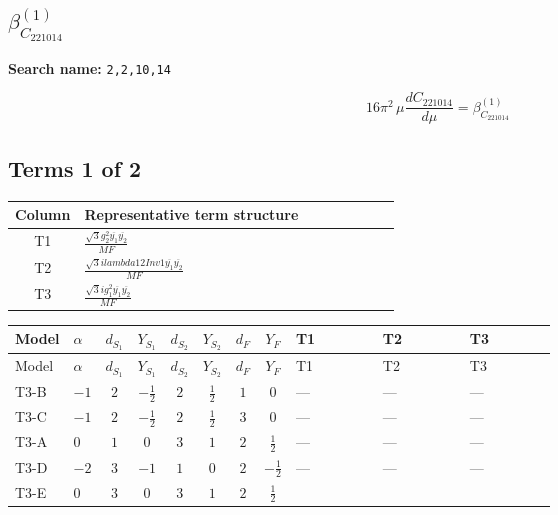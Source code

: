 \documentclass[8pt]{article}
\begin{document}
\begin{landscape}
\section*{$\beta_{C_{221014}}^{(1)}$}
\noindent\textbf{Search name: }\texttt{2,2,10,14}\par\smallskip
\[16\pi^2\,\mu\frac{d C_{221014}}{d\mu}=\beta_{C_{221014}}^{(1)}\]
\subsection*{Terms 1 of 2}
\begin{center}
\begin{tabular}{@{}c >{\raggedright\arraybackslash}p{0.82\linewidth}@{}}
\toprule
Column & Representative term structure \\
\midrule
T1 & \(\displaystyle \frac{\sqrt{3} g_{2}^{2} \overline{y_{1}} \overline{y_{2}}}{MF}\) \\
\midrule
T2 & \(\displaystyle \frac{\sqrt{3} i lambda12Inv1 \overline{y_{1}} \overline{y_{2}}}{MF}\) \\
\midrule
T3 & \(\displaystyle \frac{\sqrt{3} i g_{1}^{2} \overline{y_{1}} \overline{y_{2}}}{MF}\) \\
\midrule
\bottomrule
\end{tabular}
\end{center}
\smallskip
\tiny
\begin{longtable}{@{}llcccccc >{\raggedright\arraybackslash}p{0.21\linewidth} >{\raggedright\arraybackslash}p{0.21\linewidth} >{\raggedright\arraybackslash}p{0.21\linewidth}@{}}
\toprule
Model & $\alpha$ & $d_{S_1}$ & $Y_{S_1}$ & $d_{S_2}$ & $Y_{S_2}$ & $d_F$ & $Y_F$ & T1 & T2 & T3 \\
\midrule
\endfirsthead
\toprule
Model & $\alpha$ & $d_{S_1}$ & $Y_{S_1}$ & $d_{S_2}$ & $Y_{S_2}$ & $d_F$ & $Y_F$ & T1 & T2 & T3 \\
\midrule
\endhead
T3-B & $-1$ & $2$ & $-\frac{1}{2}$ & $2$ & $\frac{1}{2}$ & $1$ & $0$ & --- & --- & --- \\
\midrule
T3-C & $-1$ & $2$ & $-\frac{1}{2}$ & $2$ & $\frac{1}{2}$ & $3$ & $0$ & --- & --- & --- \\
\midrule
T3-A & $0$ & $1$ & $0$ & $3$ & $1$ & $2$ & $\frac{1}{2}$ & --- & --- & --- \\
\midrule
T3-D & $-2$ & $3$ & $-1$ & $1$ & $0$ & $2$ & $-\frac{1}{2}$ & --- & --- & --- \\
\midrule
T3-E & $0$ & $3$ & $0$ & $3$ & $1$ & $2$ & $\frac{1}{2}$ & \scriptsize\adjustbox{max width=\linewidth}{$\begin{gathered} - \frac{\sqrt{3} g_{2}^{2} \overline{y_{1}} \overline{y_{2}}}{6 MF}\end{gathered}$} & \scriptsize\adjustbox{max width=\linewidth}{$\begin{gathered} - \frac{\sqrt{3} i lambda12Inv1 \overline{y_{1}} \overline{y_{2}}}{6 MF}\end{gathered}$} & \scriptsize\adjustbox{max width=\linewidth}{$\begin{gathered} \frac{\sqrt{3} i g_{1}^{2} \overline{y_{1}} \overline{y_{2}}}{8 MF}\end{gathered}$} \\

\end{longtable}
\end{landscape}
\end{document}
